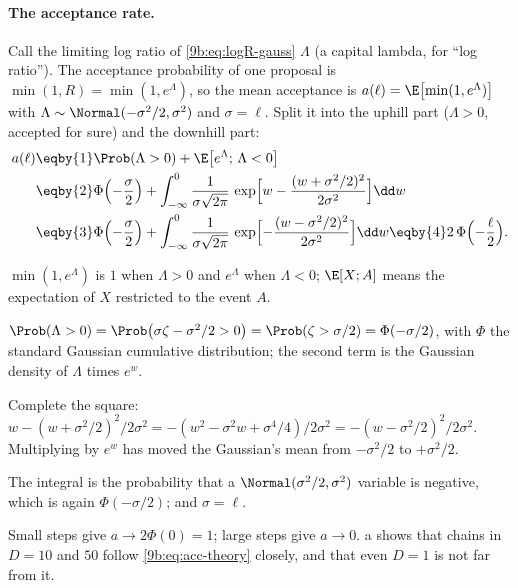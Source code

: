 \paragraph{The acceptance rate.}
Call the limiting log ratio of \eqref{9b:eq:logR-gauss} $\Lambda$ (a capital lambda, for
``log ratio''). The acceptance probability of one proposal is $\min(1,R)=\min(1,e^\Lambda)$, so
the mean acceptance is $a(\ell)=\E\bigl[\min(1,e^{\Lambda})\bigr]$ with
$\Lambda\sim\Normal(-\sigma^2/2,\sigma^2)$ and $\sigma=\ell$. Split it into the uphill part
($\Lambda>0$, accepted for sure) and the
downhill part:
\begin{align}
  a(\ell)
  &\eqby{1}\Prob(\Lambda>0)+\E\bigl[e^\Lambda;\,\Lambda<0\bigr]
  \nonumber\\
  &\eqby{2}\Phi\Bigl(-\frac\sigma2\Bigr)
   +\int_{-\infty}^0\frac{1}{\sigma\sqrt{2\pi}}\,
     \exp\Bigl[w-\frac{(w+\sigma^2/2)^2}{2\sigma^2}\Bigr]\dd w
  \nonumber\\
  &\eqby{3}\Phi\Bigl(-\frac\sigma2\Bigr)
   +\int_{-\infty}^0\frac{1}{\sigma\sqrt{2\pi}}\,
     \exp\Bigl[-\frac{(w-\sigma^2/2)^2}{2\sigma^2}\Bigr]\dd w
  \eqby{4}2\,\Phi\Bigl(-\frac\ell2\Bigr).
  \label{9b:eq:acc-theory}
\end{align}
\begin{explain}
  \item $\min(1,e^\Lambda)$ is $1$ when $\Lambda>0$ and $e^\Lambda$ when $\Lambda<0$; $\E[X;A]$ means the expectation of
        $X$ restricted to the event $A$.
  \item $\Prob(\Lambda>0)=\Prob\bigl(\sigma\zeta-\sigma^2/2>0\bigr)=\Prob(\zeta>\sigma/2)=\Phi(-\sigma/2)$,
        with $\Phi$ the standard Gaussian cumulative distribution; the second term is the
        Gaussian density of $\Lambda$ times $e^w$.
  \item Complete the square:
        $w-(w+\sigma^2/2)^2/2\sigma^2=-(w^2-\sigma^2w+\sigma^4/4)/2\sigma^2=-(w-\sigma^2/2)^2/2\sigma^2$.
        Multiplying by $e^w$ has moved the Gaussian's mean from $-\sigma^2/2$ to $+\sigma^2/2$.
  \item The integral is the probability that a $\Normal(\sigma^2/2,\sigma^2)$ variable is
        negative, which is again $\Phi(-\sigma/2)$; and $\sigma=\ell$.
\end{explain}
Small steps give $a\to2\Phi(0)=1$; large steps give $a\to0$. a shows
that chains in $D=10$ and $50$ follow \eqref{9b:eq:acc-theory} closely, and that even $D=1$ is
not far from it.

